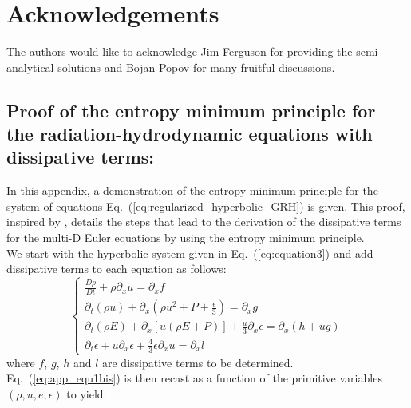 \documentclass[review]{elsarticle}
\newcommand{\eqt}[1]{Eq.~(\ref{#1})}                     %
\begin{document}
\section*{Acknowledgements}
The authors would like to acknowledge Jim Ferguson for providing the semi-analytical solutions and Bojan Popov for many fruitful discussions. 
\newpage
\begin{appendices}
\section{Proof of the entropy minimum principle for the radiation-hydrodynamic equations with dissipative terms:}
\label{app:appendixA}
In this appendix, a demonstration of the entropy minimum principle for the system of equations \eqt{eq:regularized_hyperbolic_GRH} is given. This proof, inspired by \cite{jlg}, details the steps that lead to the derivation of the dissipative terms for the multi-D Euler equations by using the entropy minimum principle.\\
We start with the hyperbolic system given in \eqt{eq:equation3} and add dissipative terms to each equation as follows:
\begin{equation}
\label{eq:app_equ1bis}
\left\{
\begin{array}{llll}
\frac{D \rho}{Dt} + \rho \partial_x u = \partial_x f \\
\partial_t (\rho u) + \partial_x \left(\rho u^2 +  P + \frac{\epsilon}{3} \right) = \partial_x g  \\
\partial_t (\rho E) + \partial_x \left[ u \left( \rho E +P \right) \right] + \frac{u}{3} \partial_x \epsilon = \partial_x \left( h + ug \right) \\
\partial_t \epsilon + u \partial_x \epsilon + \frac{4}{3} \epsilon \partial_x u = \partial_x l
\end{array}
\right.
\end{equation}
where $f$, $g$, $h$ and $l$ are dissipative terms to be determined.
\eqt{eq:app_equ1bis} is then recast as a function of the primitive variables $(\rho, u, e, \epsilon)$ to yield:

\end{appendices}
\end{document}
